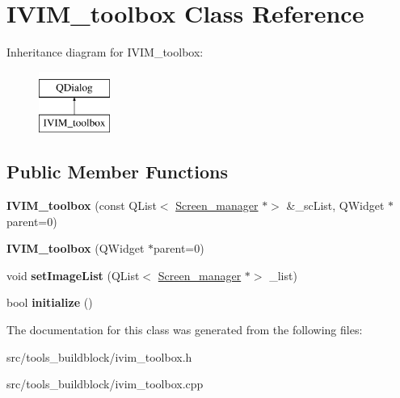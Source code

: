\hypertarget{classIVIM__toolbox}{}\section{I\+V\+I\+M\+\_\+toolbox Class Reference}
\label{classIVIM__toolbox}
Inheritance diagram for I\+V\+I\+M\+\_\+toolbox\+:\begin{figure}[H]
\begin{center}
\leavevmode
\includegraphics[height=2.000000cm]{classIVIM__toolbox}
\end{center}
\end{figure}
\subsection*{Public Member Functions}
\begin{DoxyCompactItemize}
\item 
\mbox{\label{classIVIM__toolbox_a9d85b7349764a673acadb68556b36076}} 
{\bfseries I\+V\+I\+M\+\_\+toolbox} (const Q\+List$<$ \mbox{\hyperlink{classScreen__manager}{Screen\+\_\+manager}} $\ast$$>$ \&\+\_\+sc\+List, Q\+Widget $\ast$parent=0)
\item 
\mbox{\label{classIVIM__toolbox_a074ef9f76632c07c62a5d560bfeddbd2}} 
{\bfseries I\+V\+I\+M\+\_\+toolbox} (Q\+Widget $\ast$parent=0)
\item 
\mbox{\label{classIVIM__toolbox_ab33c4c90b9ffce6b860d3e02f8eb3c5e}} 
void {\bfseries set\+Image\+List} (Q\+List$<$ \mbox{\hyperlink{classScreen__manager}{Screen\+\_\+manager}} $\ast$$>$ \+\_\+list)
\item 
\mbox{\label{classIVIM__toolbox_adccace77916a635407425cf9406c99fe}} 
bool {\bfseries initialize} ()
\end{DoxyCompactItemize}


The documentation for this class was generated from the following files\+:\begin{DoxyCompactItemize}
\item 
src/tools\+\_\+buildblock/ivim\+\_\+toolbox.\+h\item 
src/tools\+\_\+buildblock/ivim\+\_\+toolbox.\+cpp\end{DoxyCompactItemize}
